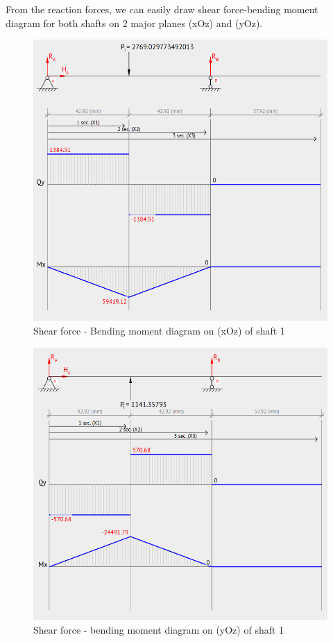 From the reaction forces, we can easily draw shear force-bending moment diagram for both shafts on 2 major planes (xOz) and (yOz).
\begin{figure}
	\centering
	\includegraphics[width=150mm]{shaft1_xoz.png}
	\caption{Shear force - Bending moment diagram on (xOz) of shaft 1}
	\label{1_xoz}
\end{figure}

\begin{figure}[ht]
	\centering
	\includegraphics[width=150mm]{shaft1_yoz.png}
	\caption{Shear force - bending moment diagram on (yOz) of shaft 1}
	\label{1_yoz}
\end{figure}

